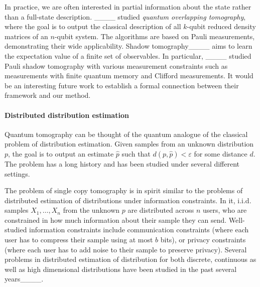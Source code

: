 In practice, we are often interested in partial information about the state rather than a full-state description. ____ studied \textit{quantum overlapping tomography}, where the goal is to output the classical description of all $k$-qubit reduced
density matrices of an $n$-qubit system. The algorithms are based on Pauli measurements, demonstrating their wide applicability. 
Shadow tomography____ aims to learn the expectation value of a finite set of observables. In particular, ____ studied Pauli shadow tomography with various measurement constraints such as measurements with finite quantum memory and Clifford measurements. It would be an interesting future work to establish a formal connection between their framework and our method.


\paragraph{Distributed distribution estimation}

Quantum tomography can be thought of the quantum analogue of the classical problem of distribution estimation. Given samples from an unknown distribution $p$, the goal is to output an estimate $\hat p$ such that $d(p,\hat p)<\varepsilon$ for some distance $d$. The problem has a long history and has been studied under several different settings. 

The problem of single copy tomography is in spirit similar to the problems of distributed estimation of distributions under information constraints. 
In it, i.i.d. samples $X_1, \ldots, X_n$ from the unknown $p$ are distributed across $n$ users, who are constrained in how much information about their sample they can send. 
Well-studied information constraints include communication constraints (where each user has to compress their sample using at most $b$ bits), or privacy constraints (where each user has to add noise to their sample to preserve privacy). Several problems in distributed estimation of distribution for both discrete, continuous as well as high dimensional distributions have been studied in the past several years____.